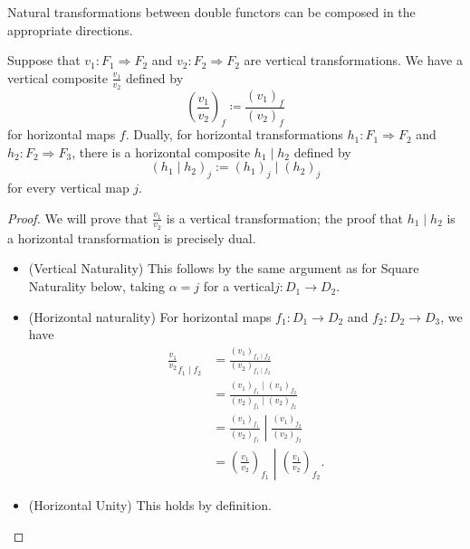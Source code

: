 \documentclass[DynamicalBook]{subfiles}
\begin{document}
Natural transformations between double functors can be composed in the
appropriate directions.
\begin{lemma}
Suppose that $v_1 : F_1 \Rightarrow F_2$ and $v_2 : F_2 \Rightarrow F_2$ are
vertical transformations. We have a vertical composite $\frac{v_1}{v_2}$ defined
by
$$\left( \frac{v_1}{v_2} \right)_f \coloneqq \frac{(v_1)_f}{(v_2)_f}$$
for horizontal maps $f$. Dually, for horizontal transformations $h_1 : F_1
\Rightarrow F_2$ and $h_2 : F_2 \Rightarrow F_3$, there is a horizontal
composite $h_1 \mid h_2$ defined by
$$(h_1 \mid h_2)_j := (h_1)_j \mid (h_2)_j$$
for every vertical map $j$.
\end{lemma}
\begin{proof}
  We will prove that $\frac{v_1}{v_2}$ is a vertical transformation; the proof
  that $h_1 \mid h_2$ is a horizontal transformation is precisely dual. 
  \begin{itemize}
  \item (Vertical Naturality) This follows by the same argument as for Square
    Naturality below, taking $\alpha = j$ for a vertical$j : D_1 \to D_2$.

\item (Horizontal naturality) For horizontal maps $f_1 :D_1 \to D_2$ and $f_2 :
  D_2 \to D_3$, we have
  \begin{align*}
    \frac{v_1}{v_2}_{f_1 \mid f_2} &= \frac{(v_1)_{f_1 \mid f_2}}{(v_2)_{f_1 \mid f_2}} \\
                                   &= \frac{(v_1)_{f_1} \mid (v_1)_{f_2}}{(v_2)_{f_1} \mid (v_2)_{f_2}} \\
                                   &= \left. \frac{(v_1)_{f_1}}{(v_2)_{f_1}} \middle| \frac{(v_1)_{f_2}}{(v_2)_{f_2}} \right.\\
    &= \left. \left( \frac{v_1}{v_2} \right)_{f_1} \middle| \left( \frac{v_1}{v_2} \right)_{f_2} \right. .
  \end{align*}

    
\item (Horizontal Unity) This holds by definition.


\end{itemize}
\end{proof}
\end{document}
